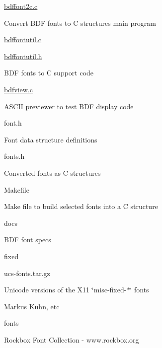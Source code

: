 \begin{DoxyItemize}
\begin{DoxyItemize}
\begin{DoxyItemize}
\item \hyperlink{bdffont2c_8c}{bdffont2c.\-c}
\begin{DoxyItemize}
\item Convert B\-D\-F fonts to C structures main program
\end{DoxyItemize}
\item \hyperlink{bdffontutil_8c}{bdffontutil.\-c}
\item \hyperlink{bdffontutil_8h}{bdffontutil.\-h}
\begin{DoxyItemize}
\item B\-D\-F fonts to C support code
\end{DoxyItemize}
\item \hyperlink{bdfview_8c}{bdfview.\-c}
\begin{DoxyItemize}
\item A\-S\-C\-I\-I previewer to test B\-D\-F display code
\end{DoxyItemize}
\item font.\-h
\begin{DoxyItemize}
\item Font data structure definitions
\end{DoxyItemize}
\item fonts.\-h
\begin{DoxyItemize}
\item Converted fonts as C structures
\end{DoxyItemize}
\item Makefile
\begin{DoxyItemize}
\item Make file to build selected fonts into a C structure
\end{DoxyItemize}
\item docs
\begin{DoxyItemize}
\item B\-D\-F font specs
\end{DoxyItemize}
\item fixed
\begin{DoxyItemize}
\item ucs-\/fonts.\-tar.\-gz
\item Unicode versions of the X11 \char`\"{}misc-\/fixed-\/$\ast$\char`\"{} fonts
\item Markus Kuhn, etc
\end{DoxyItemize}
\item fonts
\begin{DoxyItemize}
\item Rockbox Font Collection -\/ www.\-rockbox.\-org

\end{DoxyItemize}
\end{DoxyItemize}
\end{DoxyItemize}
\end{DoxyItemize}
